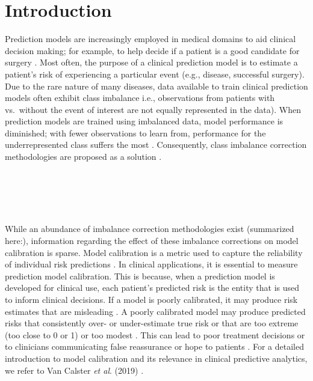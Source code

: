 \documentclass[AMA,STIX1COL,]{WileyNJD-v2}
\begin{document}
\hypertarget{introduction}{%
\section{Introduction}\label{introduction}}

Prediction models are increasingly employed in medical domains to aid
clinical decision making; for example, to help decide if a patient is a
good candidate for surgery \citep{ewout_intro, annals, achilles}. Most
often, the purpose of a clinical prediction model is to estimate a
patient's risk of experiencing a particular event (e.g., disease,
successful surgery). Due to the rare nature of many diseases, data
available to train clinical prediction models often exhibit class
imbalance i.e., observations from patients with vs.~without the event of
interest are not equally represented in the data). When prediction
models are trained using imbalanced data, model performance is
diminished; with fewer observations to learn from, performance for the
underrepresented class suffers the most \citep{cip, lp2}. Consequently,
class imbalance correction methodologies are proposed as a solution
\citep{cip, summary_m, lp, summary_h}.\\
\strut \\
\strut \\
\strut \\
While an abundance of imbalance correction methodologies exist
(summarized here:\citep{summary_m, lp, summary_h}), information
regarding the effect of these imbalance corrections on model calibration
is sparse. Model calibration is a metric used to capture the reliability
of individual risk predictions \citep{achilles}. In clinical
applications, it is essential to measure prediction model calibration.
This is because, when a prediction model is developed for clinical use,
each patient's predicted risk is the entity that is used to inform
clinical decisions. If a model is poorly calibrated, it may produce risk
estimates that are misleading \citep{achilles}. A poorly calibrated
model may produce predicted risks that consistently over- or
under-estimate true risk or that are too extreme (too close to 0 or 1)
or too modest \citep{achilles}. This can lead to poor treatment
decisions or to clinicians communicating false reassurance or hope to
patients \citep{achilles, 12days}. For a detailed introduction to model
calibration and its relevance in clinical predictive analytics, we refer
to Van Calster \emph{et al}. (2019) \citep{achilles, bens_paper}.\\
\end{document}
